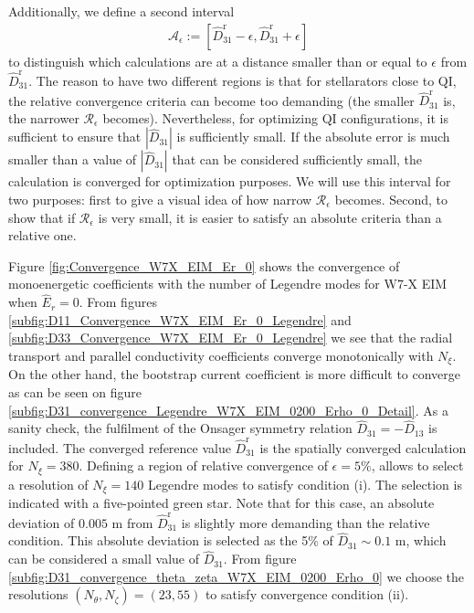 \documentclass[10pt]{iopart}
\begin{document}
Additionally, we define a second interval 
%
\begin{align}
	\mathcal{A}_{\epsilon}:=
	\left[
	\widehat{D}_{31}^{\text{r}}-\epsilon, \widehat{D}_{31}^{\text{r}}+\epsilon 
	\right]
\end{align}
to distinguish which calculations are at a distance smaller than or equal to $\epsilon$ from $\widehat{D}_{31}^{\text{r}}$. The reason to have two different regions is that for stellarators close to QI, the relative convergence criteria can become too demanding (the smaller $\widehat{D}_{31}^{\text{r}}$ is, the narrower $\mathcal{R}_{\epsilon}$ becomes). Nevertheless, for optimizing QI configurations, it is sufficient to ensure that $|\widehat{D}_{31}|$ is sufficiently small. If the absolute error is much smaller than a value of $|\widehat{D}_{31}|$ that can be considered sufficiently small, the calculation is converged for optimization purposes. We will use this interval for two purposes: first to give a visual idea of how narrow $\mathcal{R}_{\epsilon}$ becomes. Second, to show that if $\mathcal{R}_{\epsilon}$ is very small, it is easier to satisfy an absolute criteria than a relative one. 

Figure \ref{fig:Convergence_W7X_EIM_Er_0} shows the convergence of monoenergetic coefficients with the number of Legendre modes for W7-X EIM when $\widehat{E}_r=0$. From figures \ref{subfig:D11_Convergence_W7X_EIM_Er_0_Legendre} and \ref{subfig:D33_Convergence_W7X_EIM_Er_0_Legendre} we see that the radial transport and parallel conductivity coefficients converge monotonically with $N_\xi$. On the other hand, the bootstrap current coefficient is more difficult to converge as can be seen on figure \ref{subfig:D31_convergence_Legendre_W7X_EIM_0200_Erho_0_Detail}. As a sanity check, the fulfilment of the Onsager symmetry relation $\widehat{D}_{31}= - \widehat{D}_{13}$ is included. The converged reference value $\widehat{D}_{31}^{\text{r}}$ is the spatially converged calculation for $N_\xi=380$. Defining a region of relative convergence of $\epsilon=5\%$, allows to select a resolution of $N_\xi=140$ Legendre modes to satisfy condition (i). The selection is indicated with a five-pointed green star. Note that for this case, an absolute deviation of $0.005$ m from $\widehat{D}_{31}^{\text{r}}$ is slightly more demanding than the relative condition. This absolute deviation is selected as the 5\% of $\widehat{D}_{31}\sim 0.1$ m, which can be considered a small value of $\widehat{D}_{31}$. From figure \ref{subfig:D31_convergence_theta_zeta_W7X_EIM_0200_Erho_0} we choose the resolutions $(N_\theta,N_\zeta)=(23,55)$ to satisfy convergence condition (ii). 
\end{document}
